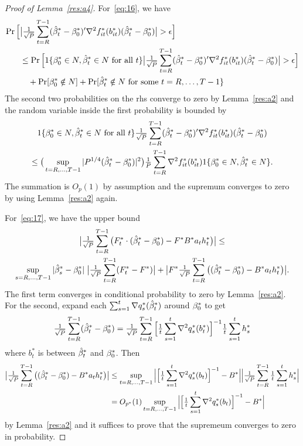 \documentclass[12pt,fleqn]{article}
\begin{document}
\begin{proof}[Proof of Lemma~\ref{res:a4}]
For~\eqref{eq:16}, we have
\begin{align*}
  \pr\Big[& \big|\oclt{t} (\bh_t^* - \btrue^*)' \nabla^2 f_{it}^*(b_{it}^*) (\bh_t^* - \btrue^*) \big| > \epsilon \Big] \\
  &\leq \pr\Big[1\{\btrue^* \in N, \bh_t^* \in N\ \text{for all}\ t\} \big|\oclt{t} (\bh_t^* - \btrue^*)' \nabla^2 f_{it}^*(b_{it}^*) (\bh_t^* - \btrue^*) \big| > \epsilon \Big] \\
  &\quad + \pr[\btrue^* \notin N] + \pr[\bh_t^* \notin N\ \text{for some}\ t = R,\dots,T-1\}
\end{align*}
The second two probabilities on the rhs converge to zero by
Lemma~\ref{res:a2} and the random variable inside the first probability is bounded by
\begin{multline*}
  1\{\beta_0^* \in N, \hat \beta_t^* \in N\ \text{for all}\ t\}
  \tfrac{1}{\sqrt{P}} \sum_{t=R}^{T-1} (\hat \beta_t^* - \beta_0^*)' \nabla^2 f_{it}^*(b_{it}^*) (\hat \beta_t^* - \beta_0^*)
  \\ \leq
  \big(\sup_{t=R,\dots,T-1} |P^{1/4}(\hat \beta_t^* - \beta_0^*)|^2\big) \tfrac{1}{P} \sum_{t=R}^{T-1}  \nabla^2 f_{it}^*(b_{it}^*) 1\{\beta_0^* \in N, \hat \beta_t^* \in N\}.
\end{multline*}
The summation is $O_p(1)$ by assumption and the supremum converges to
zero by using Lemma~\ref{res:a2} again.

For~\eqref{eq:17}, we have the upper bound
\begin{multline*}
  \big\lvert \tfrac{1}{\sqrt{P}} \sum_{t=R}^{T-1} \big(F_t^* \cdot (\hat \beta_t^* - \beta_0^*) - F^* B^* a_t h_t^*\big) \big\rvert \leq \\
   \sup_{s=R,\dots,T-1} |\hat \beta_s^* - \beta_0^*|\; \big\lvert \tfrac{1}{\sqrt{P}} \sum_{t=R}^{T-1} (F_t^* - F^*) \big\rvert
  + \big\lvert F^* \tfrac{1}{\sqrt{P}} \sum_{t=R}^{T-1} \big((\hat \beta_t^* - \beta_0^*) - B^* a_t h_t^*\big) \big\rvert.
\end{multline*}
The first term converges in conditional probability to zero by
Lemma~\ref{res:a2}.  For the second, expand each $\sum_{s=1}^t \nabla
q_s^*(\hat \beta_t^*)$ around $\beta_0^*$ to get
\begin{equation*}
  \tfrac{1}{\sqrt{P}} \sum_{t=R}^{T-1} (\hat \beta_t^* - \beta_0^*)
  = \tfrac{1}{\sqrt{P}} \sum_{t=R}^{T-1} \Big[\tfrac{1}{t} \sum_{s=1}^t \nabla^2 q_s^*(b_t^*)\Big]^{-1} \tfrac{1}{t} \sum_{s=1}^t h_s^*
\end{equation*}
where $b_t^*$ is between $\hat \beta_t^*$ and $\beta_0^*$. Then
\begin{align*}
  \big\lvert \tfrac{1}{\sqrt{P}} \sum_{t=R}^{T-1} \big((\hat \beta_t^* - \beta_0^*) - B^* a_t h_t^*\big) \big\rvert
  &\leq \sup_{t=R,\dots,T-1} \Big\lvert\Big[\tfrac{1}{t} \sum_{s=1}^t \nabla^2 q_s^*(b_t)\Big]^{-1} - B^*\Big\rvert
  \Big\lvert\tfrac{1}{\sqrt{P}} \sum_{t=R}^{T-1} \tfrac{1}{t} \sum_{s=1}^t h_s^* \Big\rvert \\
  &= O_{p^*}(1) \sup_{t=R,\dots,T-1} \Big\lvert\Big[\tfrac{1}{t} \sum_{s=1}^t \nabla^2 q_s^*(b_t)\Big]^{-1} - B^*\Big\rvert
\end{align*}
by Lemma~\ref{res:a2} and it suffices to prove that the supremeum
converges to zero in probability.


\end{proof}
\end{document}
